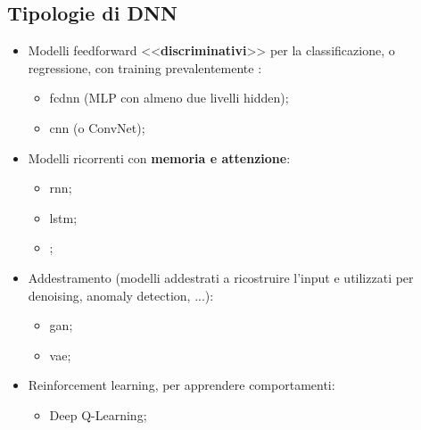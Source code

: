\subsection{Tipologie di DNN}\label{sub:tipologie_di_dnn} %
\begin{itemize}
    \item[] Modelli feedforward <<\textbf{discriminativi}>> per la classificazione, o regressione, con training prevalentemente :
        \begin{itemize}
            \item \ac{fcdnn} (MLP con almeno due livelli hidden);
            \item \ac{cnn} (o ConvNet);
        \end{itemize}
    \item[] Modelli ricorrenti con \textbf{memoria e attenzione}:
        \begin{itemize}
            \item \ac{rnn};
            \item \ac{lstm};
            \item {};
        \end{itemize}
    \item[] Addestramento  (modelli addestrati a ricostruire l'input e utilizzati per denoising, anomaly detection, ...):
        \begin{itemize}
            \item \ac{gan};
            \item \ac{vae};
        \end{itemize}
    \item[] Reinforcement learning, per apprendere comportamenti:
        \begin{itemize}
            \item Deep Q-Learning;
        \end{itemize}
\end{itemize}
\newpage
